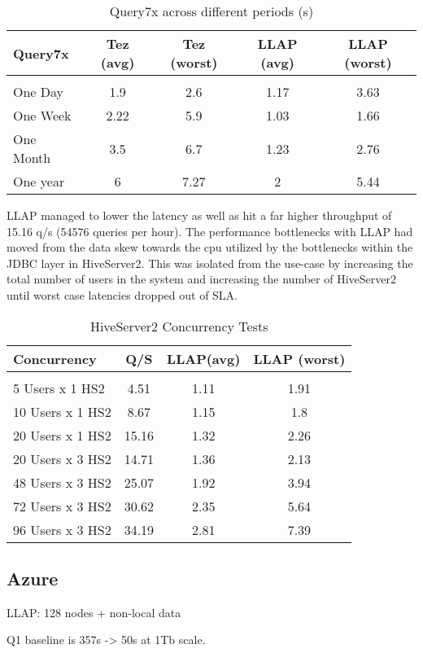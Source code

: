 \begin{table}[h]
\begin{tabular}{l|*{4}c}
Query7x  &   Tez (avg)  &   Tez (worst)  &   LLAP (avg)  &   LLAP (worst) \\
\hline \\
One Day  &   1.9  &   2.6  &   1.17  &   3.63 \\
One Week  &   2.22  &   5.9  &   1.03  &   1.66 \\
One Month  &   3.5  &   6.7  &   1.23  &   2.76 \\
One year  &   6  &   7.27  &   2  &   5.44 \\
\end{tabular}
\caption{Query7x across different periods (s)}
\end{table}

LLAP managed to lower the latency as well as hit a far higher throughput of 15.16 q/s (54576 queries per hour). The 
performance bottlenecks with LLAP had moved from the data skew towards the cpu utilized by the bottlenecks within
the JDBC layer in HiveServer2. This was isolated from the use-case by increasing the total number of users in the system and
increasing the number of HiveServer2 until worst case latencies dropped out of SLA.

\begin{table}[h]
\begin{tabular}{l|*{3}c}
Concurrency & Q/S & LLAP(avg) & LLAP (worst) \\
\hline \\
5 Users x 1 HS2 & 4.51 & 1.11 & 1.91 \\
10 Users x 1 HS2 & 8.67 & 1.15 & 1.8 \\
20 Users x 1 HS2 & 15.16 & 1.32 & 2.26 \\
20 Users x 3 HS2 & 14.71 & 1.36 & 2.13 \\
48 Users x 3 HS2 & 25.07 & 1.92 & 3.94 \\
72 Users x 3 HS2 & 30.62 & 2.35 & 5.64 \\
96 Users x 3 HS2 & 34.19 & 2.81 & 7.39 \\
\end{tabular}
\caption{HiveServer2 Concurrency Tests}
\end{table}



\subsection{Azure}

LLAP: 128 nodes + non-local data

Q1 baseline is 357s -> 50s at 1Tb scale.

